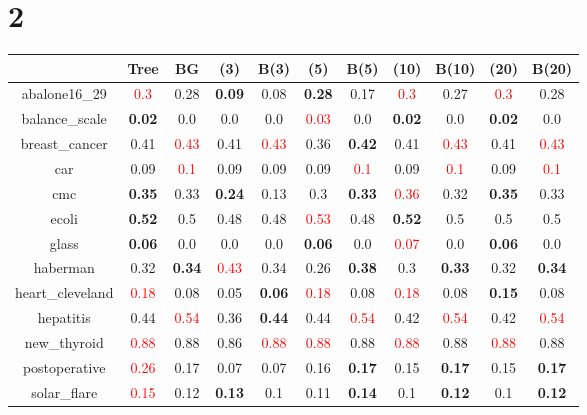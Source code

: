 \documentclass{article}%
\begin{document}
\section*{2}%
\begin{tabular}{c|cccccccccc}%
\hline%
&Tree&BG&(3)&B(3)&(5)&B(5)&(10)&B(10)&(20)&B(20)\\%
\hline%
abalone16\_29&\textcolor{red}{ 
0.3
}&0.28&\textbf{0.09}&0.08&\textbf{0.28}&0.17&\textcolor{red}{ 
0.3
}&0.27&\textcolor{red}{ 
0.3
}&0.28\\%
\hline%
balance\_scale&\textbf{0.02}&0.0&0.0&0.0&\textcolor{red}{ 
0.03
}&0.0&\textbf{0.02}&0.0&\textbf{0.02}&0.0\\%
\hline%
breast\_cancer&0.41&\textcolor{red}{ 
0.43
}&0.41&\textcolor{red}{ 
0.43
}&0.36&\textbf{0.42}&0.41&\textcolor{red}{ 
0.43
}&0.41&\textcolor{red}{ 
0.43
}\\%
\hline%
car&0.09&\textcolor{red}{ 
0.1
}&0.09&0.09&0.09&\textcolor{red}{ 
0.1
}&0.09&\textcolor{red}{ 
0.1
}&0.09&\textcolor{red}{ 
0.1
}\\%
\hline%
cmc&\textbf{0.35}&0.33&\textbf{0.24}&0.13&0.3&\textbf{0.33}&\textcolor{red}{ 
0.36
}&0.32&\textbf{0.35}&0.33\\%
\hline%
ecoli&\textbf{0.52}&0.5&0.48&0.48&\textcolor{red}{ 
0.53
}&0.48&\textbf{0.52}&0.5&0.5&0.5\\%
\hline%
glass&\textbf{0.06}&0.0&0.0&0.0&\textbf{0.06}&0.0&\textcolor{red}{ 
0.07
}&0.0&\textbf{0.06}&0.0\\%
\hline%
haberman&0.32&\textbf{0.34}&\textcolor{red}{ 
0.43
}&0.34&0.26&\textbf{0.38}&0.3&\textbf{0.33}&0.32&\textbf{0.34}\\%
\hline%
heart\_cleveland&\textcolor{red}{ 
0.18
}&0.08&0.05&\textbf{0.06}&\textcolor{red}{ 
0.18
}&0.08&\textcolor{red}{ 
0.18
}&0.08&\textbf{0.15}&0.08\\%
\hline%
hepatitis&0.44&\textcolor{red}{ 
0.54
}&0.36&\textbf{0.44}&0.44&\textcolor{red}{ 
0.54
}&0.42&\textcolor{red}{ 
0.54
}&0.42&\textcolor{red}{ 
0.54
}\\%
\hline%
new\_thyroid&\textcolor{red}{ 
0.88
}&0.88&0.86&\textcolor{red}{ 
0.88
}&\textcolor{red}{ 
0.88
}&0.88&\textcolor{red}{ 
0.88
}&0.88&\textcolor{red}{ 
0.88
}&0.88\\%
\hline%
postoperative&\textcolor{red}{ 
0.26
}&0.17&0.07&0.07&0.16&\textbf{0.17}&0.15&\textbf{0.17}&0.15&\textbf{0.17}\\%
\hline%
solar\_flare&\textcolor{red}{ 
0.15
}&0.12&\textbf{0.13}&0.1&0.11&\textbf{0.14}&0.1&\textbf{0.12}&0.1&\textbf{0.12}\\%

\end{tabular}
\end{document}
